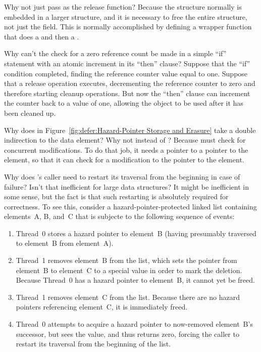 \begin{enumerate}
\QuickQ{}
	Why not just pass  as the release function?
\QuickA{}
	Because the  structure normally is embedded in
	a larger structure, and it is necessary to free the entire
	structure, not just the  field.
	This is normally accomplished by defining a wrapper function
	that does a  and then a .

\QuickQ{}
	Why can't the check for a zero reference count be
	made in a simple ``if'' statement with an atomic
	increment in its ``then'' clause?
\QuickA{}
	Suppose that the ``if'' condition completed, finding
	the reference counter value equal to one.
	Suppose that a release operation executes, decrementing
	the reference counter to zero and therefore starting
	cleanup operations.
	But now the ``then'' clause can increment the counter
	back to a value of one, allowing the object to be
	used after it has been cleaned up.

\QuickQ{}
	Why does  in
	Figure~\ref{fig:defer:Hazard-Pointer Storage and Erasure}
	take a double indirection to the data element?
	Why not  instead of ?
\QuickA{}
	Because  must check for concurrent modifications.
	To do that job, it needs a pointer to a pointer to the element,
	so that it can check for a modification to the pointer to the
	element.

\QuickQ{}
	Why does 's caller need to restart its
	traversal from the beginning in case of failure?
	Isn't that inefficient for large data structures?
\QuickA{}
	It might be inefficient in some sense, but the fact is that
	such restarting is absolutely required for correctness.
	To see this, consider a hazard-pointer-protected linked list
	containing elements~A, B, and~C that is subjecte to the
	following sequence of events:

	\begin{enumerate}
	\item	Thread~0 stores a hazard pointer to element~B
		(having presumably traversed to element~B from element~A).
	\item	Thread~1 removes element~B from the list, which sets
		the pointer from element~B to element~C to a special
		 value in order to mark the deletion.
		Because Thread~0 has a hazard pointer to element~B,
		it cannot yet be freed.
	\item	Thread~1 removes element~C from the list.
		Because there are no hazard pointers referencing element~C,
		it is immediately freed.
	\item	Thread~0 attempts to acquire a hazard pointer to
		now-removed element~B's successor, but sees the
		 value, and thus returns zero,
		forcing the caller to restart its traversal from the
		beginning of the list.
	\end{enumerate}


\end{enumerate}
